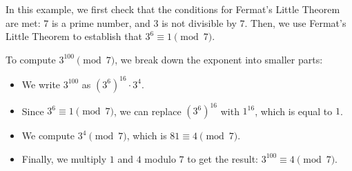             In this example, we first check that the conditions for Fermat's Little Theorem are met: $7$ is a prime number, and $3$ is not divisible by $7$. Then, we use Fermat's Little Theorem to establish that $3^6 \equiv 1 \pmod{7}$.
            
            To compute $3^{100} \pmod{7}$, we break down the exponent into smaller parts:
            \begin{itemize}
            \item We write $3^{100}$ as $(3^6)^{16} \cdot 3^4$.
            \item Since $3^6 \equiv 1 \pmod{7}$, we can replace $(3^6)^{16}$ with $1^{16}$, which is equal to $1$.
            \item We compute $3^4 \pmod{7}$, which is $81 \equiv 4 \pmod{7}$.
            \item Finally, we multiply $1$ and $4$ modulo $7$ to get the result: $3^{100} \equiv 4 \pmod{7}$.
            \end{itemize}



